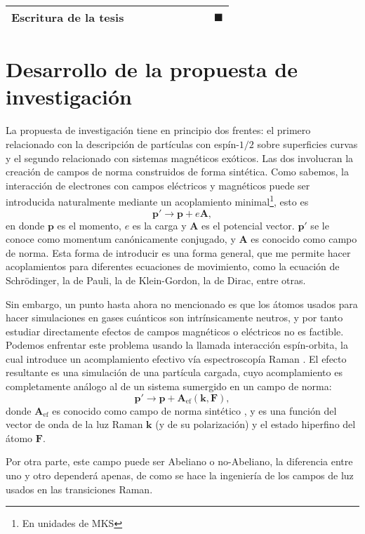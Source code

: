 \documentclass[superscriptaddress,onecolumn,aps,preprint,showpacs,nofootinbib,pra,11pt]{revtex4-2}
\begin{document}
\begin{normalsize}
\begin{table}[H]
\begin{tabular}{|c|c|c|c|c|c|c|c|l|}
\multicolumn{1}{|l|}{Escritura de la tesis} &   &   &   &   &   &   &  & $\blacksquare$  \\ \hline

\end{tabular}
\end{table}

\section{Desarrollo de la propuesta de investigación}

La propuesta de investigación tiene en principio dos frentes: el primero relacionado con la descripción de partículas con espín-$1/2$ sobre superficies curvas y el segundo relacionado con sistemas magnéticos exóticos. Las dos involucran la creaci\'on de campos de norma construidos de forma sintética. Como sabemos, la interacción de electrones con campos eléctricos y magnéticos puede ser introducida naturalmente mediante un acoplamiento minimal\footnote{En unidades de MKS}, esto es 
\[
\mathbf{p'} \rightarrow \mathbf{p}+ e \mathbf{A},
\] 
en donde $\mathbf{p}$ es el momento, $e$ es la carga y $\mathbf{A}$ es el potencial vector. $\mathbf{p'}$ se le conoce como momentum canónicamente conjugado, y $\mathbf{A}$ es conocido como campo de norma. Esta forma de introducir es una forma general, que me permite hacer acoplamientos para diferentes ecuaciones de movimiento, como la ecuación de Schrödinger, la de Pauli, la de Klein-Gordon, la de Dirac, entre otras.\medskip 

Sin embargo, un punto hasta ahora no mencionado es que los átomos usados para hacer simulaciones en gases cuánticos son intrínsicamente neutros, y por tanto estudiar directamente efectos de campos magnéticos o eléctricos no es factible. Podemos enfrentar este problema usando la llamada interacción espín-orbita, la cual introduce un acomplamiento efectivo vía espectroscopía Raman \cite{Galitski-nature494}. El efecto resultante es una simulación de una partícula cargada, cuyo acomplamiento es completamente análogo al de un sistema sumergido en un campo de norma:
\[
\mathbf{p'}\rightarrow \mathbf{p}+ \mathbf{A}_{\text{ef}}\left(\textbf{k}, \mathbf{F} \right),
\]
donde $\mathbf{A}_{\text{ef}}$ es conocido como campo de norma sintético \cite{Lin-nature462, Lin-naturephys7}, y es una función del vector de onda de la luz Raman $\textbf{k}$ (y de su polarización) y el estado hiperfino del átomo $\mathbf{F}$.\medskip 

Por otra parte, este campo puede ser Abeliano o no-Abeliano, la diferencia entre uno y otro dependerá apenas, de como se hace la ingeniería de los campos de luz usados en las transiciones Raman. 


\end{normalsize}
\end{document}
